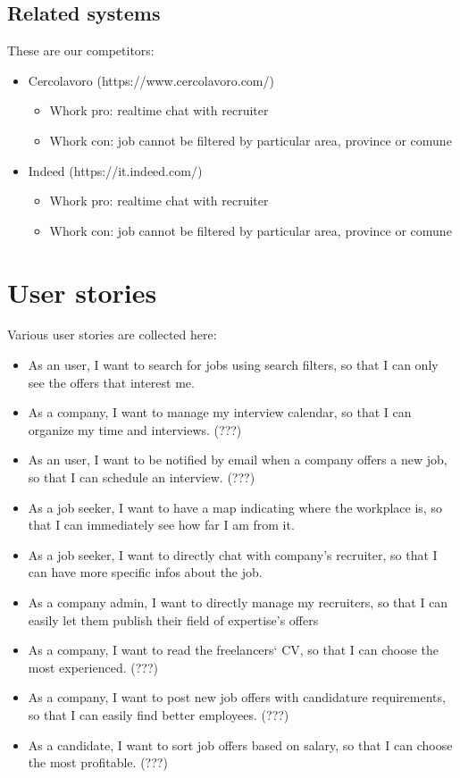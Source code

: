 \documentclass[12pt, a4paper]{article}
\begin{document}
\subsection{Related systems}
These are our competitors:
\begin{itemize}
	\item Cercolavoro (https://www.cercolavoro.com/)
	\begin{itemize}
		\item Whork pro: realtime chat with recruiter
		\item Whork con: job cannot be filtered by particular area, province or comune
	\end{itemize}
	\item Indeed (https://it.indeed.com/)
	\begin{itemize}
		\item Whork pro: realtime chat with recruiter
		\item Whork con: job cannot be filtered by particular area, province or comune
	\end{itemize}
\end{itemize}

\section{User stories}
Various user stories are collected here:
\begin{itemize}
	\item As an user, I want to search for jobs using search filters,
		so that I can only see the offers that interest me.
	\item As a company, I want to manage my interview calendar, 
		so that I can organize my time and interviews. (???)
	\item As an user, I want to be notified by email when a company 
		offers a new job, so that I can schedule an interview. (???)
	\item As a job seeker, I want to have a map indicating where the workplace is,
		so that I can immediately see how far I am from it.
	\item As a job seeker, I want to directly chat with company's recruiter,
		so that I can have more specific infos about the job.
	\item As a company admin, I want to directly manage my recruiters,
		so that I can easily let them publish their field of expertise's offers
	\item As a company, I want to read the freelancers‘ CV, 
		so that I can choose the most experienced. (???)
	\item As a company, I want to post new job offers with candidature 
		requirements, so that I can easily find better employees. (???)
	\item As a candidate, I want to sort job offers based on salary, 
		so that I can choose the most profitable.  (???)
\end{itemize}
\end{document}
